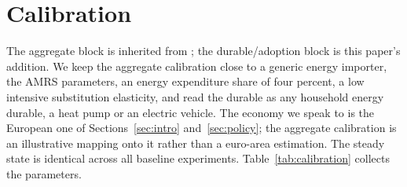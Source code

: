 %

\section{Calibration}\label{sec:cal}

The aggregate block is inherited from \citet{ARS2024}; the durable/adoption block is
this paper's addition. We keep the aggregate calibration close to a generic energy
importer, the AMRS parameters, an energy expenditure share of four percent, a low
intensive substitution elasticity, and read the durable as any household energy
durable, a heat pump or an electric vehicle. The economy we speak to is the European
one of Sections~\ref{sec:intro} and~\ref{sec:policy}; the aggregate calibration is an
illustrative mapping onto it rather than a euro-area estimation. The steady state is
identical across all baseline experiments. Table~\ref{tab:calibration} collects the
parameters.

